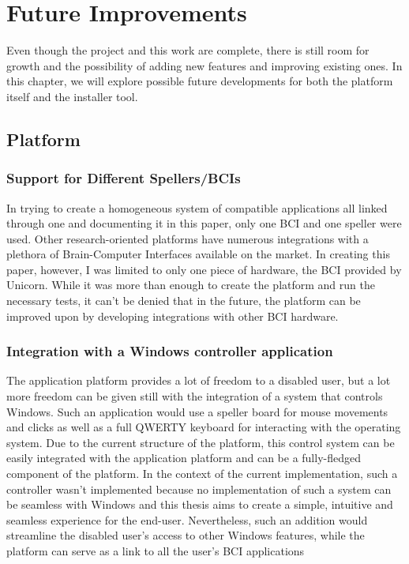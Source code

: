 
\chapter{Future Improvements}\label{cap:future}
Even though the project and this work are complete, there is still room for growth and the possibility of adding new features and improving existing ones. In this chapter, we will explore possible future developments for both the platform itself and the installer tool.

\section{Platform}
\subsection{Support for Different Spellers/BCIs}
In trying to create a homogeneous system of compatible applications all linked through one and documenting it in this paper, only one BCI and one speller were used. Other research-oriented platforms have numerous integrations with a plethora of Brain-Computer Interfaces available on the market. In creating this paper, however, I was limited to only one piece of hardware, the BCI provided by Unicorn. While it was more than enough to create the platform and run the necessary tests, it can't be denied that in the future, the platform can be improved upon by developing integrations with other BCI hardware.

\subsection{Integration with a Windows controller application}
The application platform provides a lot of freedom to a disabled user, but a lot more freedom can be given still with the integration of a system that controls Windows. Such an application would use a speller board for mouse movements and clicks as well as a full QWERTY keyboard for interacting with the operating system. Due to the current structure of the platform, this control system can be easily integrated with the application platform and can be a fully-fledged component of the platform.
\vspace{\baselineskip}\newline
In the context of the current implementation, such a controller wasn't implemented because no implementation of such a system can be seamless with Windows and this thesis aims to create a simple, intuitive and seamless experience for the end-user. Nevertheless, such an addition would streamline the disabled user's access to other Windows features, while the platform can serve as a link to all the user's BCI applications 



